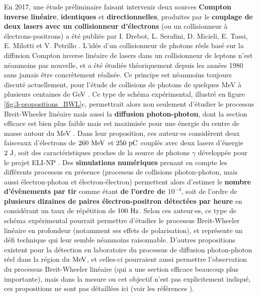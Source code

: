 \begin{refsection}
En 2017, une étude préliminaire faisant intervenir deux sources \textbf{Compton inverse linéaire}, \textbf{identiques} et \textbf{directionnelles}, produites par le \textbf{couplage de deux lasers avec un collisionneur d'électrons} (ou un collisionneur à électrons-positrons) a été publiée par I. Drebot, L. Serafini, D. Micieli, E. Tassi, E. Milotti et V. Petrillo \parencite{drebot_2017a}.
L'idée d'un collisionneur de photons réels basé sur la diffusion Compton inverse linéaire de lasers dans un collisionneur de leptons n'est néanmoins pas nouvelle, et a été étudiée théoriquement depuis les années 1980 sans jamais être concrètement réalisée. Ce principe est néanmoins toujours discuté actuellement, pour l'étude de collisions de photons de quelques MeV à plusieurs centaines de GeV \parencite{chou_2018, takahashi_2019}. Ce type de schéma expérimental, illustré en figure \ref{fig:3-propositions_BWL}c, permettrait alors non seulement d'étudier le processus Breit-Wheeler linéaire mais aussi la \textbf{diffusion photon-photon}, dont la section efficace est bien plus faible mais est maximisée pour une énergie du centre de masse autour du MeV \parencite{drebot_2017a}. Dans leur proposition, ces auteur$\cdot$es considèrent deux faisceaux d'électrons de $260 ~ \rm MeV$ et $250 ~ \rm pC$ couplés avec deux lasers d'énergie $2 ~ \rm J$, soit des caractéristiques proches de la source de photons $\gamma$ développée pour le projet ELI-NP \parencite{tanaka_2020}. Des \textbf{simulations numériques} prenant en compte les différents processus en présence (processus de collisions photon-photon, mais aussi électron-photon et électron-électron) permettent alors d'estimer le \textbf{nombre d'évènements par tir} comme étant \textbf{de l'ordre de $10^{-4}$}, soit de l'ordre de \textbf{plusieurs dizaines de paires électron-positron détectées par heure} en considérant un taux de répétition de $100 ~ \rm Hz$. Selon ces auteur$\cdot$es, ce type de schéma expérimental pourrait permettre d'étudier le processus Breit-Wheeler linéaire en profondeur (notamment ses effets de polarisation), et représente un défi technique qui leur semble néanmoins raisonnable. D'autres propositions existent pour la détection en laboratoire du processus de diffusion photon-photon réel dans la région du $\rm MeV$, et celles-ci pourraient aussi permettre l'observation du processus Breit-Wheeler linéaire (qui a une section efficace beaucoup plus importante), mais dans la mesure ou cet objectif n'est pas explicitement indiqué, ces propositions ne sont pas détaillées ici (voir les références \parencite{homma_2016, takahashi_2018, takahashi_2019}).



\end{refsection}
